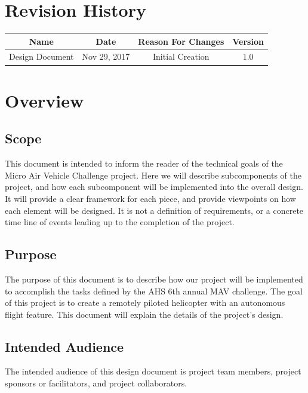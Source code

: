 \documentclass[onecolumn, draftclsnofoot,10pt, compsoc]{IEEEtran}
\begin{document}
\section*{Revision History}

\begin{center}
    \begin{tabular}{|c|c|c|c|}
        \hline
		Name & Date & Reason For Changes & Version\\
        \hline
		Design Document & Nov 29, 2017 & Initial Creation & 1.0\\
		\hline 
    \end{tabular}
\end{center}




\section{Overview}


\subsection{Scope}%

This document is intended to inform the reader of the technical goals of the Micro Air Vehicle Challenge project. Here we will describe subcomponents of the project, and how each subcomponent will be implemented into the overall design. It will provide a clear framework for each piece, and provide viewpoints on how each element will be designed. It is not a definition of requirements, or a concrete time line of events leading up to the completion of the project.


\subsection{Purpose}%

The purpose of this document is to describe how our project will be implemented to accomplish the tasks defined by the AHS 6th annual MAV challenge. The goal of this project is to create a remotely piloted helicopter with an autonomous flight feature. This document will explain the details of the project's design.


\subsection{Intended Audience}

The intended audience of this design document is project team members, project sponsors or facilitators, and project collaborators.  
\end{document}
